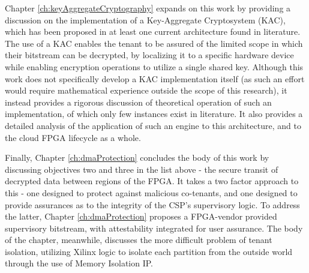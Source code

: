 Chapter \ref{ch:keyAggregateCryptography} expands on this work by providing a discussion on the implementation of a Key-Aggregate Cryptosystem (KAC), which has been proposed in at least one current architecture found in literature. The use of a KAC enables the tenant to be assured of the limited scope in which their bitstream can be decrypted, by localizing it to a specific hardware device while enabling encryption operations to utilize a single shared key. Although this work does not specifically develop a KAC implementation itself (as such an effort would require mathematical experience outside the scope of this research), it instead provides a rigorous discussion of theoretical operation of such an implementation, of which only few instances exist in literature. It also provides a detailed analysis of the application of such an engine to this architecture, and to the cloud FPGA lifecycle as a whole.

Finally, Chapter \ref{ch:dmaProtection} concludes the body of this work by discussing objectives two and three in the list above - the secure transit of decrypted data between regions of the FPGA. It takes a two factor approach to this - one designed to protect against malicious co-tenants, and one designed to provide assurances as to the integrity of the CSP's supervisory logic. To address the latter, Chapter \ref{ch:dmaProtection} proposes a FPGA-vendor provided supervisory bitstream, with attestability integrated for user assurance. The body of the chapter, meanwhile, discusses the more difficult problem of tenant isolation, utilizing Xilinx logic to isolate each partition from the outside world through the use of Memory Isolation IP.
